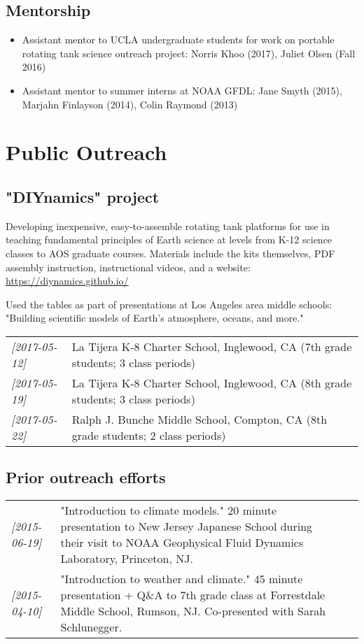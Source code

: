 \documentclass[12pt,letterpaper]{shillcv}
\begin{document}
\subsection*{Mentorship}
\label{sec:org5f49de1}
\begin{itemize}
\item Assistant mentor to UCLA undergraduate students for work on portable rotating
tank science outreach project: Norris Khoo (2017), Juliet Olsen (Fall 2016)
\item Assistant mentor to summer interns at NOAA GFDL: Jane Smyth (2015), Marjahn
Finlayson (2014), Colin Raymond (2013)
\end{itemize}
\section*{Public Outreach}
\label{sec:org20a49ec}
\subsection*{"DIYnamics" project}
\label{sec:org92f9352}
Developing inexpensive, easy-to-assemble rotating tank platforms for use in
teaching fundamental principles of Earth science at levels from K-12 science
classes to AOS graduate courses.  Materials include the kits themselves, PDF
assembly instruction, instructional videos, and a website: \url{https://diynamics.github.io/}

Used the tables as part of presentations at Los Angeles area middle schools:
"Building scientific models of Earth's atmosphere, oceans, and more."
\begin{center}
\begin{tabular}{ll}
\textit{[2017-05-12]} & La Tijera K-8 Charter School, Inglewood, CA (7th grade students; 3 class periods)\\
\textit{[2017-05-19]} & La Tijera K-8 Charter School, Inglewood, CA (8th grade students; 3 class periods)\\
\textit{[2017-05-22]} & Ralph J. Bunche Middle School, Compton, CA (8th grade students; 2 class periods)\\
\end{tabular}
\end{center}
\subsection*{Prior outreach efforts}
\label{sec:orgfe9d3ed}
\begin{center}
\begin{tabularx}{\textwidth}{lX}
\textit{[2015-06-19]} & "Introduction to climate models."  20 minute presentation to New Jersey Japanese School during their visit to NOAA Geophysical Fluid Dynamics Laboratory, Princeton, NJ. &  &  & \\
\textit{[2015-04-10]} & "Introduction to weather and climate."  45 minute presentation + Q\&A to 7th grade class at Forrestdale Middle School, Rumson, NJ.  Co-presented with Sarah Schlunegger. &  &  & \\
\end{tabularx}
\end{center}
\end{document}
